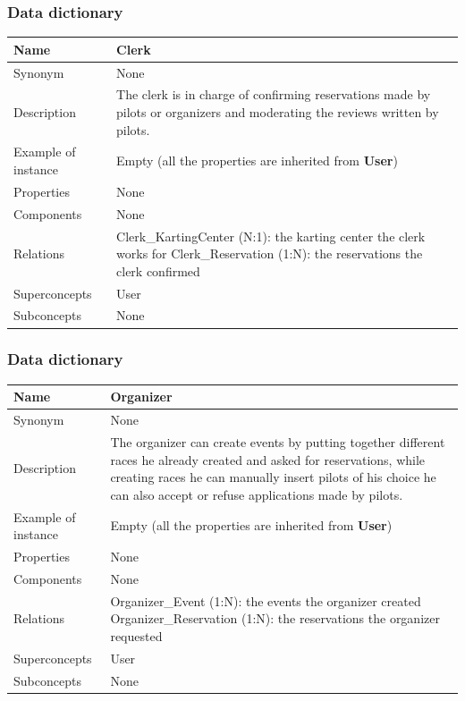 \documentclass{beamer}
\begin{document}
\begin{frame}
    \frametitle{Data dictionary}
    \begin{table}
    \tiny
    \begin{tabular}{|p{2cm}|p{6cm}|}
    \hline
    Name & \textbf{Clerk} \\
    \hline
    Synonym & None \\
    \hline
    Description & The clerk is in charge of confirming reservations made by pilots or organizers and 
    moderating the reviews written by pilots. \\
    \hline
    Example of instance & Empty (all the properties are inherited from \textbf{User}) \\
    \hline
    Properties & None \\
    \hline
    Components & None \\
    \hline
    Relations &
    Clerk\_KartingCenter (N:1): the karting center the clerk works for \newline
    Clerk\_Reservation (1:N): the reservations the clerk confirmed \\
    \hline
    Superconcepts & User \\
    \hline
    Subconcepts & None \\
    \hline
    \end{tabular}
    \end{table}
\end{frame}

\begin{frame}
    \frametitle{Data dictionary}
    \begin{table}
    \tiny
    \begin{tabular}{|p{2cm}|p{6cm}|}
    \hline
    Name & \textbf{Organizer} \\
    \hline
    Synonym & None \\
    \hline
    Description & The organizer can create events by putting together
    different races he already created and asked for reservations,
    while creating races he can manually insert pilots of his choice
    he can also accept or refuse applications made by pilots. \\
    \hline
    Example of instance & Empty (all the properties are inherited from \textbf{User}) \\
    \hline
    Properties & None \\
    \hline
    Components & None \\
    \hline
    Relations &
    Organizer\_Event (1:N): the events the organizer created \newline
    Organizer\_Reservation (1:N): the reservations the organizer requested \\
    \hline
    Superconcepts & User \\
    \hline
    Subconcepts & None \\
    \hline
    \end{tabular}
    \end{table}
\end{frame}
\end{document}
